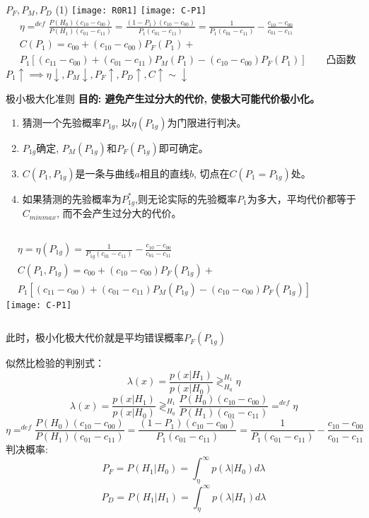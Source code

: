 \begin{frame}{$P_F,P_M,P_D$ (1)}
\texttt{[image: R0R1]}
\texttt{[image: C-P1]}
\begin{align*}
&\eta\mathop{=}^{def}\frac{P(H_0)(c_{10}-c_{00})}{P(H_1)(c_{01}-c_{11})}=\frac{(1-P_1)(c_{10}-c_{00})}{P_1(c_{01}-c_{11})}=\frac{1}{P_1(c_{01}-c_{11})}-\frac{c_{10}-c_{00}}{c_{01}-c_{11}}\\
&C(P_1)=c_{00}+(c_{10}-c_{00})P_F(P_1)+\\
&P_1[(c_{11}-c_{00})+(c_{01}-c_{11})P_M(P_1)-(c_{10}-c_{00})P_F(P_1)]\qquad \text{凸函数}
\end{align*}
$P_1\uparrow\implies \eta\downarrow, P_M\downarrow, P_F\uparrow, P_D\uparrow, C\uparrow\sim\downarrow$
\end{frame}

\begin{frame}{极小极大化准则}
\textbf{目的: 避免产生过分大的代价, 使极大可能代价极小化。}
\begin{enumerate}
	\item 猜测一个先验概率$P_{1g}$, 以$\eta(P_{1g})$为门限进行判决。
	\item $P_{1g}$确定, $P_M(P_{1g})$和$P_F(P_{1g})$即可确定。
	\item $C(P_1,P_{1g})$是一条与曲线$a$相且的直线$b$, 切点在$C(P_1=P_{1g})$处。
	\item 如果猜测的先验概率为$P_{1g}^{\ast}$,则无论实际的先验概率$P_1$为多大，平均代价都等于$C_{minmax}$, 而不会产生过分大的代价。
\end{enumerate}
\begin{columns}
	\begin{align*}
	&\eta=\eta(P_{1g})=\frac{1}{P_{1g}(c_{01}-c_{11})}-\frac{c_{10}-c_{00}}{c_{01}-c_{11}}\\
	&C(P_1,P_{1g})=c_{00}+(c_{10}-c_{00})P_F(P_{1g})+\\
	&P_1[(c_{11}-c_{00})+(c_{01}-c_{11})P_M(P_{1g})-(c_{10}-c_{00})P_F(P_{1g})]
	\end{align*}
	\texttt{[image: C-P1]}
\end{columns}
\end{frame}

\begin{frame}
此时，极小化极大代价就是平均错误概率$P_F(P_{1g})$

\bigskip

似然比检验的判别式：
\[\lambda(x)=\frac{p(x|H_1)}{p(x|H_0)}\mathop{\gtrless}_{H_0}^{H_1}\eta \]
\[\lambda(x)=\frac{p(x|H_1)}{p(x|H_0)}\mathop{\gtrless}_{H_0}^{H_1}\frac{P(H_0)(c_{10}-c_{00})}{P(H_1)(c_{01}-c_{11})}\mathop{=}^{def}\eta \]
\[\eta\mathop{=}^{def}\frac{P(H_0)(c_{10}-c_{00})}{P(H_1)(c_{01}-c_{11})}=\frac{(1-P_1)(c_{10}-c_{00})}{P_1(c_{01}-c_{11})}=\frac{1}{P_1(c_{01}-c_{11})}-\frac{c_{10}-c_{00}}{c_{01}-c_{11}}\]
判决概率:
\[P_F=P(H_1|H_0)=\int_{\eta}^{\infty}p(\lambda|H_0)d\lambda \]
\[P_D=P(H_1|H_1)=\int_{\eta}^{\infty}p(\lambda|H_1)d\lambda \]
\end{frame}

